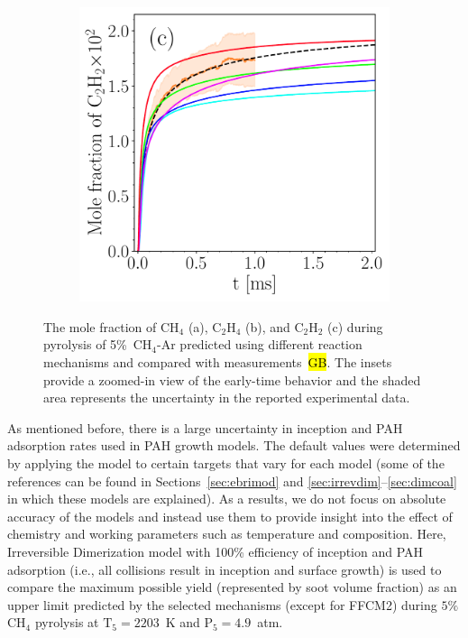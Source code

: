 \begin{figure}[H]
\begin{subfigure}[t]{0.32\textwidth}
	\end{subfigure}
	\begin{subfigure}[t]{0.32\textwidth}
		\includegraphics[width=1\textwidth]{Figures/Results/chemistry/C2H2.pdf}
	\end{subfigure}
	\caption{The mole fraction of $\mathrm{CH_4}$ (a), $\mathrm{C_2H_4}$ (b), and $\mathrm{C_2H_2}$ (c) during pyrolysis of 5\%~$\mathrm{CH_4}$-Ar predicted using different reaction mechanisms and compared with measurements~\hl{GB}. The insets provide a zoomed-in view of the early-time behavior and the shaded area represents the uncertainty in the reported experimental data.}
	\label{fig:CH4_C2H2_C2H4_chem} 
\end{figure}

As mentioned before, there is a large uncertainty in inception and PAH adsorption rates used in PAH growth models. The default values were determined by applying the model to certain targets that vary for each model (some of the references can be found in Sections~\ref{sec:ebrimod} and \ref{sec:irrevdim}–\ref{sec:dimcoal} in which these models are explained). As a results, we do not focus on absolute accuracy of the models and instead use them to provide insight into the effect of chemistry and working parameters such as temperature and composition.
Here, Irreversible Dimerization model with 100\% efficiency of inception and PAH adsorption (i.e., all collisions result in inception and surface growth) is used to compare the maximum possible yield (represented by soot volume fraction) as an upper limit predicted by the selected mechanisms (except for FFCM2) during $5\%$ $\mathrm{CH_4}$ pyrolysis at $\mathrm{T_5}=2203$~K and $\mathrm{P_5}=4.9$~atm. 


